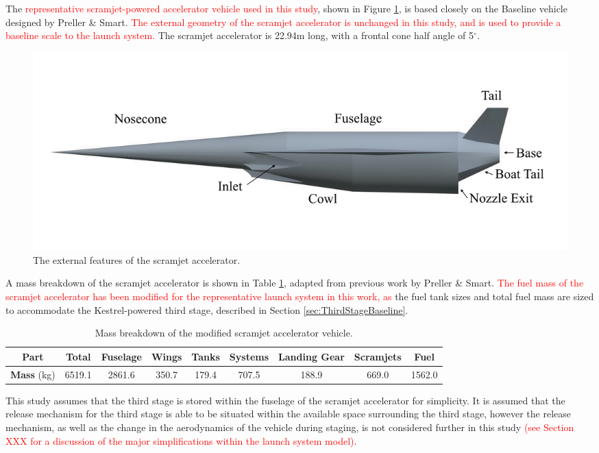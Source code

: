 		The \textcolor{red}{representative scramjet-powered accelerator vehicle used in this study}, shown in Figure \ref{fig:SPARTANlabelled}, is based closely on the Baseline vehicle designed by Preller \& Smart\cite{Preller2017b}. \textcolor{red}{The external geometry of the scramjet accelerator is unchanged in this study, and is used to provide a baseline scale to the launch system.} The scramjet accelerator is 22.94m long, with a frontal cone half angle of 5$^\circ$\cite{Preller2017b}. 
		\begin{figure}[ht]
			\centering
			\includegraphics[width=0.85\linewidth]{figures/3_vehicle_design/SPARTANlabelled}
			\caption{The external features of the scramjet accelerator.}
			\label{fig:SPARTANlabelled}
		\end{figure}
		A mass breakdown of the scramjet accelerator is shown in Table \ref{tab:MassBreakdown}, adapted from previous work by Preller \& Smart\cite{Preller2017b}. \textcolor{red}{The fuel mass of the scramjet accelerator has been modified for the representative launch system in this work, as} the fuel tank sizes and total fuel mass are sized to accommodate the Kestrel-powered third stage, described in Section \ref{sec:ThirdStageBaseline}.
		\begin{table}[h]
		\begin{tabular}{|c|c|c|c|c|c|c|c|c|}
			\hline  \textbf{Part} & Total & Fuselage & Wings & Tanks & Systems & Landing Gear & Scramjets & Fuel \\ 
			\hline \textbf{Mass} (kg) & 6519.1 & 2861.6 & 350.7 & 179.4 & 707.5 & 188.9 & 669.0 & 1562.0 \\ 
			\hline 
		\end{tabular} 
		\caption{Mass breakdown of the modified scramjet accelerator vehicle.}
		\label{tab:MassBreakdown}
		\end{table}
This study assumes that the third stage is stored within the fuselage of the scramjet accelerator for simplicity. It is assumed that the release mechanism for the third stage is able to be situated within the available space surrounding the third stage, however the release mechanism, as well as the change in the aerodynamics of the vehicle during staging,  is not considered further in this study \textcolor{red}{(see Section XXX for a discussion of the major simplifications within the launch system model)}. %
		
